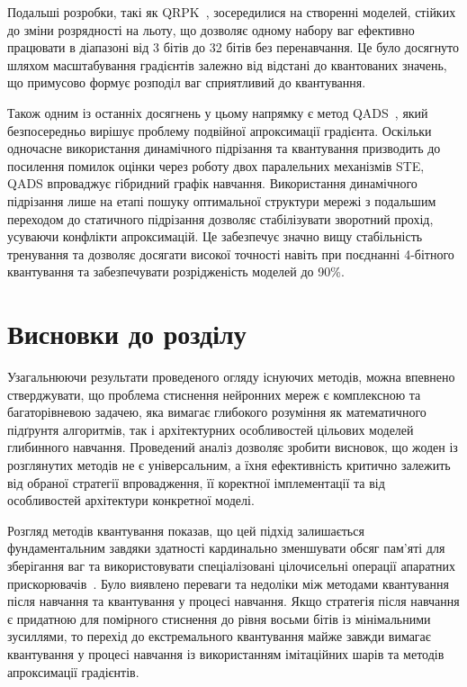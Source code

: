 \documentclass{pma-mthesis}
\begin{document}
Подальші розробки, такі як QRPK~\cite{Kim2023QuantizationRP}, зосередилися на створенні моделей, стійких до зміни розрядності на льоту, що дозволяє одному набору ваг ефективно працювати в діапазоні від 3 бітів до 32 бітів без перенавчання. Це було досягнуто шляхом масштабування градієнтів залежно від відстані до квантованих значень, що примусово формує розподіл ваг сприятливий до квантування. 

Також одним із останніх досягнень у цьому напрямку є метод QADS~\cite{10946020}, який безпосередньо вирішує проблему подвійної апроксимації градієнта. Оскільки одночасне використання динамічного підрізання та квантування призводить до посилення помилок оцінки через роботу двох паралельних механізмів STE, QADS впроваджує гібридний графік навчання. Використання динамічного підрізання лише на етапі пошуку оптимальної структури мережі з подальшим переходом до статичного підрізання дозволяє стабілізувати зворотний прохід, усуваючи конфлікти апроксимацій. Це забезпечує значно вищу стабільність тренування та дозволяє досягати високої точності навіть при поєднанні 4-бітного квантування та забезпечувати розрідженість моделей до 90\%.

\section{Висновки до розділу}
\label{sec:methods_conclusions}
Узагальнюючи результати проведеного огляду існуючих методів, можна впевнено стверджувати, що проблема стиснення нейронних мереж є комплексною та багаторівневою задачею, яка вимагає глибокого розуміння як математичного підґрунтя алгоритмів, так і архітектурних особливостей цільових моделей глибинного навчання. Проведений аналіз дозволяє зробити висновок, що жоден із розглянутих методів не є універсальним, а їхня ефективність критично залежить від обраної стратегії впровадження, її коректної імплементації та від особливостей архітектури конкретної моделі. 

Розгляд методів квантування показав, що цей підхід залишається фундаментальним завдяки здатності кардинально зменшувати обсяг пам’яті для зберігання ваг та використовувати спеціалізовані цілочисельні операції апаратних прискорювачів~\cite{gholami2022survey}. Було виявлено переваги та недоліки між методами квантування після навчання та квантування у процесі навчання. Якщо стратегія після навчання є придатною для помірного стиснення до рівня восьми бітів із мінімальними зусиллями, то перехід до екстремального квантування майже завжди вимагає квантування у процесі навчання із використанням імітаційних шарів та методів апроксимації градієнтів.
\end{document}
